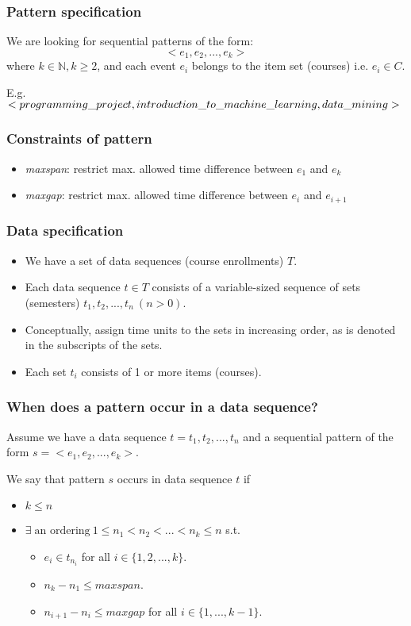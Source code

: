 \documentclass{beamer}
\begin{document}
\begin{frame}
  \frametitle{Pattern specification}
  We are looking for sequential patterns of the form:
  $$
    <e_1, e_2, ..., e_k>
  $$
  where $k \in \mathbb{N}, k \geq 2$, and each event $e_i$ belongs to the item
  set (courses) i.e. $e_i \in C$.

  \quad

  E.g.
  $
  <programming\_project, introduction\_to\_machine\_learning, \linebreak data\_mining>
  $

\end{frame}

\begin{frame}
  \frametitle{Constraints of pattern}
  \begin{itemize}
    \item{\emph{maxspan}: restrict max. allowed time difference between $e_1$
    and $e_k$}
    \item{\emph{maxgap}: restrict max. allowed time difference between $e_i$
    and $e_{i+1}$}
  \end{itemize}
\end{frame}

\begin{frame}
  \frametitle{Data specification}
  \begin{itemize}
    \item{We have a set of data sequences (course enrollments) $T$.}
    \item{Each data sequence $t \in T$ consists of a variable-sized sequence of
    sets (semesters)  $t_1, t_2, ..., t_n \: (n > 0)$.}
    \item{Conceptually, assign time units to the sets in increasing order,
    as is denoted in the subscripts of the sets.}
    \item{Each set $t_i$ consists of 1 or more items (courses).}
  \end{itemize}
\end{frame}

\begin{frame}
  \frametitle{When does a pattern occur in a data sequence?}
  Assume we have a data sequence $t = t_1, t_2, ..., t_n$ and a sequential
  pattern of the form $s = <e_1, e_2, ..., e_k>$.

  \quad

  We say that pattern $s$ occurs in data sequence $t$ if
  \begin{itemize}
    \item{$k \leq n$}
    \item{$\exists \; \text{an ordering} \: 1 \leq n_1 < n_2 < ... <
    n_k \leq n$ s.t.
    \begin{itemize}
      \item{$e_i \in t_{n_i}$ for all $i \in \{1,2,...,k\}$.}
      \item{$n_k - n_1 \leq maxspan$.}
      \item{$n_{i+1} - n_i \leq maxgap$ for all $i \in \{1, ..., k-1\}$.}
    \end{itemize}
    }
  \end{itemize}
\end{frame}
\end{document}
